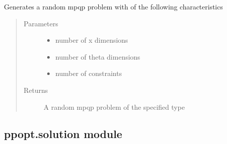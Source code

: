 \documentclass[letterpaper,10pt,english]{sphinxmanual}
\begin{document}
\begin{fulllineitems}
\label{\detokenize{ppopt:ppopt.problem_generator.generate_mpqp}}
\sphinxAtStartPar
Generates a random mpqp problem with of the following characteristics
\begin{quote}\begin{description}
\item[{Parameters}] \leavevmode\begin{itemize}
\item {} 
\sphinxAtStartPar
{} \textendash{} number of x dimensions

\item {} 
\sphinxAtStartPar
{} \textendash{} number of theta dimensions

\item {} 
\sphinxAtStartPar
{} \textendash{} number of constraints

\end{itemize}

\item[{Returns}] \leavevmode
\sphinxAtStartPar
A random mpqp problem of the specified type

\end{description}\end{quote}

\end{fulllineitems}



\subsection{ppopt.solution module}
\label{\detokenize{ppopt:module-ppopt.solution}}\label{\detokenize{ppopt:ppopt-solution-module}}
\end{document}
